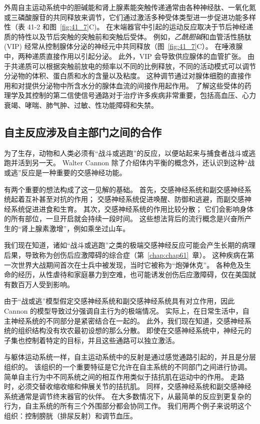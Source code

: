 外周自主运动系统中的胆碱能和肾上腺素能突触传递通常由各种神经肽、一氧化氮或三磷酸腺苷的共同释放来调节，它们通过激活多种受体类型进一步促进功能多样性（表 41-2 和图~\ref{fig:41_7}C)。
在末端器官中引起的运动反应取决于节后神经递质的特性以及节后突触的突触前和突触后受体。
例如，\textit{乙酰胆碱}和血管活性肠肽 (VIP) 经常从控制腺体分泌的神经元中共同释放（图~\ref{fig:41_7}C）。
在唾液腺中，两种递质直接作用以引起分泌。
此外，VIP 会导致供应腺体的血管扩张。
由于共递质可以根据突触前放电的频率以不同的比例释放，不同的活动模式可以调节分泌物的体积、蛋白质和水的含量以及粘度。
这种调节通过对腺体细胞的直接作用和对提供分泌物中所含水分的腺体血流的间接作用起作用。
了解这些受体的药理学及其控制的第二信使信号通路对于治疗许多疾病非常重要，包括高血压、心力衰竭、哮喘、肺气肿、过敏、性功能障碍和失禁。



\subsection{自主反应涉及自主部门之间的合作}

为了生存，动物和人类必须有“战斗或逃跑”的反应，以便站起来与捕食者战斗或逃跑并活到另一天。
Walter Cannon 除了介绍体内平衡的概念外，还认识到这种“战或逃”反应是一种重要的交感神经功能。


有两个重要的想法构成了这一见解的基础。
首先，交感神经系统和副交感神经系统起着互补甚至对抗的作用；
交感神经系统促进唤醒、防御和逃避，而副交感神经系统促进进食和生育。
其次，交感神经系统的作用比较分散；
它们会影响身体的所有部位，一旦开启就会持续一段时间。
这些想法背后的流行概念是兴奋所产生的“肾上腺素激增”，例如乘坐过山车。


我们现在知道，诸如“战斗或逃跑”之类的极端交感神经反应可能会产生长期的病理后果，导致称为创伤后应激障碍的综合症（第~\ref{chap:chap61}~章）。
这种疾病在第一次世界大战期间首次在士兵中被发现，当时它被称为“炮弹休克”。
各种危及生命的经历，从性虐待和家庭暴力到空难，也可能诱发创伤后应激障碍，仅在美国就有数百万人受到影响。


由于“战或逃”模型假定交感神经系统和副交感神经系统具有对立作用，因此 Cannon 的模型导致过分强调自主行为的极端情况。
实际上，在日常生活中，自主神经系统的不同部分是紧密结合在一起的。
此外，我们现在知道，交感神经系统的组织结构没有坎农最初设想的那么分散。
即使在交感神经系统中，神经元的子集也控制着特定的目标，并且这些通路可以独立激活。


与躯体运动系统一样，自主运动系统中的反射是通过感觉通路引起的，并且是分层组织的。
该组织的一个重要特征是它允许在自主系统的不同部门之间进行协调。
简单自主行为中不同系统之间的相互作用类似于拮抗肌在运动中的作用。
走路时，必须交替收缩收缩和伸展关节的拮抗肌。
同样，交感神经系统和副交感神经系统通常是调节终末器官的伙伴。
在大多数情况下，从最简单的反应到更复杂的行为，自主系统的所有三个外围部分都会协同工作。
我们用两个例子来说明这个组织：控制膀胱（排尿反射）和调节血压。


